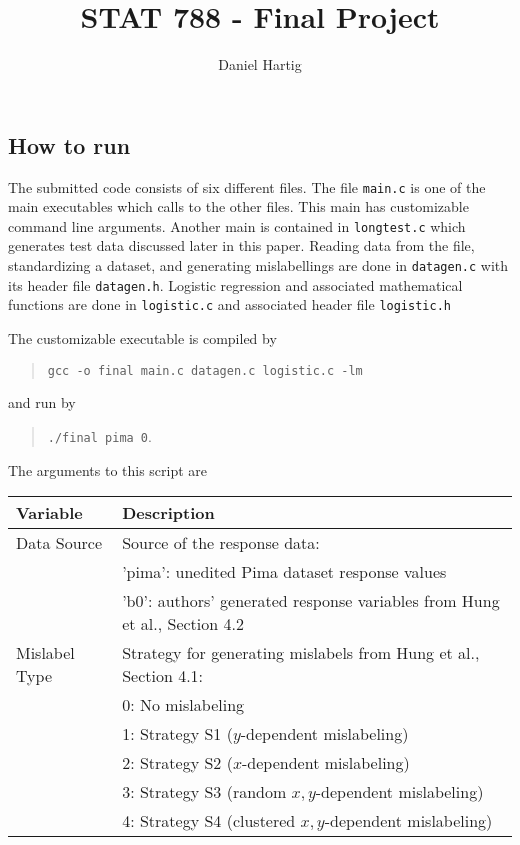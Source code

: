 \documentclass{article}
\title{STAT 788 - Final Project}
\author{Daniel Hartig}
\begin{document}
\maketitle

\subsection*{How to run}

The submitted code consists of six different files. The file \texttt{main.c} is one of the main executables which calls to the other files. This main has customizable command line arguments. Another main is contained in \texttt{longtest.c} which generates test data discussed later in this paper. Reading data from the file, standardizing a dataset, and generating mislabellings are done in \texttt{datagen.c} with its header file \texttt{datagen.h}. Logistic regression and associated mathematical functions are done in \texttt{logistic.c} and associated header file \texttt{logistic.h}

The customizable executable is compiled by 

\begin{quote}\verb!gcc -o final main.c datagen.c logistic.c -lm!\end{quote}

and run by 

\begin{quote}\verb!./final pima 0!.\end{quote}

The arguments to this script are
\begin{center}
\begin{tabular}{ l|l}
\hline
Variable&Description\\
\hline
Data Source& Source of the response data:\\
&'pima': unedited Pima dataset response values\\
&'b0': authors' generated response variables from Hung et al., Section 4.2\\
Mislabel Type&Strategy for generating mislabels from Hung et al., Section 4.1:\\
&0: No mislabeling\\
&1: Strategy S1 ($y$-dependent mislabeling)\\
&2: Strategy S2 ($x$-dependent mislabeling)\\
&3: Strategy S3 (random $x, y$-dependent mislabeling)\\
&4: Strategy S4 (clustered $x, y$-dependent mislabeling)\\
\end{tabular}
\end{center}
\end{document}

